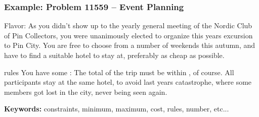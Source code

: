 \begin{frame}
  \frametitle{Example: Problem 11559 -- Event Planning}

  {\smaller
  \begin{alertblock}{Flavor:}
    As you didn't show up to the yearly general meeting of the Nordic
    Club of Pin Collectors, you were unanimously elected to organize
    this years excursion to Pin City.  You are free to choose from a
    number of weekends this autumn, and have to find a suitable hotel
    to stay at, preferably as cheap as possible.
  \end{alertblock}

  \begin{exampleblock}{rules}
    You have some : The total
     of the trip must be within
    , of course. All participants
     stay at the same hotel, to avoid last years
    catastrophe, where some members got lost in the city, never being seen
    again.
  \end{exampleblock}}

  \bigskip

  {\bf Keywords:} constraints, minimum, maximum, cost, rules, number,
  etc...
\end{frame}

